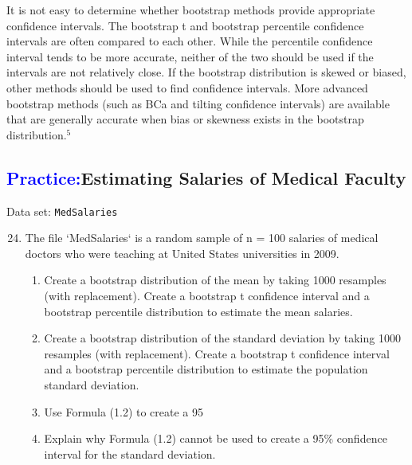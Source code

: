 \documentclass[
]{report}
\begin{document}
It is not easy to determine whether bootstrap methods provide appropriate confidence intervals. The bootstrap t and bootstrap percentile confidence intervals are often compared to each other. While the percentile confidence interval tends to be more accurate, neither of the two should be used if the intervals are not relatively
close. If the bootstrap distribution is skewed or biased, other methods should be used to find confidence intervals. More advanced bootstrap methods (such as BCa and tilting confidence intervals) are available that are generally accurate when bias or skewness exists in the bootstrap distribution.\(^5\)

\hypertarget{estimating-salaries-of-medical-faculty}{%
\subsection*{\texorpdfstring{\textcolor{blue}{Practice:}Estimating Salaries of Medical Faculty}{Estimating Salaries of Medical Faculty}}\label{estimating-salaries-of-medical-faculty}}

\vspace{-1em}

Data set: \texttt{MedSalaries}

\begin{enumerate}
 \setcounter{enumi}{23}
 \item The file `MedSalaries` is a random sample of n = 100 salaries of medical doctors who were teaching at United States universities in 2009.
 \begin{enumerate}
 \item Create a bootstrap distribution of the mean by taking 1000 resamples (with replacement). Create a bootstrap t confidence interval and a bootstrap percentile distribution to estimate the mean salaries.

  \item Create a bootstrap distribution of the standard deviation by taking 1000 resamples (with replacement). Create a bootstrap t confidence interval and a bootstrap percentile distribution to estimate the population standard deviation.

  \item Use Formula (1.2) to create a 95%

  \item Explain why Formula (1.2) cannot be used to create a 95\% confidence interval for the standard deviation.
\end{enumerate}
\end{enumerate}
\end{document}
